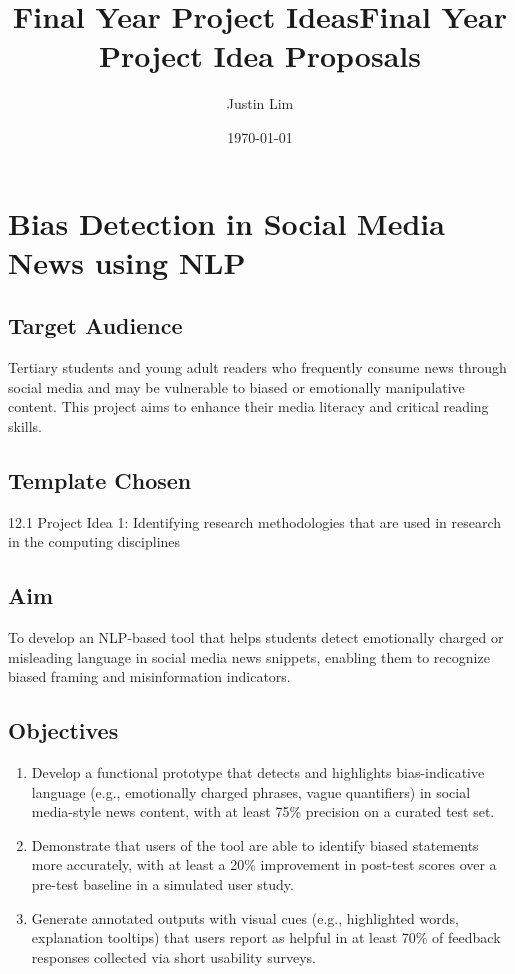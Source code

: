 \documentclass[12pt]{article}
\title{Final Year Project Ideas}
\title{Final Year Project Idea Proposals}
\author{Justin Lim}
\date{\today}
\begin{document}
\maketitle
\tableofcontents
\newpage

\section{Bias Detection in Social Media News using NLP}

\subsection*{Target Audience}
Tertiary students and young adult readers who frequently consume news through social media and may be vulnerable to biased or emotionally manipulative content. This project aims to enhance their media literacy and critical reading skills.

\subsection*{Template Chosen}
12.1 Project Idea 1: Identifying research methodologies that are used
in research in the computing disciplines

\subsection*{Aim}
To develop an NLP-based tool that helps students detect emotionally charged or misleading language in social media news snippets, enabling them to recognize biased framing and misinformation indicators.

\subsection*{Objectives}
\begin{enumerate}[label=\arabic*.]
    \item Develop a functional prototype that detects and highlights bias-indicative language (e.g., emotionally charged phrases, vague quantifiers) in social media-style news content, with at least 75\% precision on a curated test set.
    \item Demonstrate that users of the tool are able to identify biased statements more accurately, with at least a 20\% improvement in post-test scores over a pre-test baseline in a simulated user study.
    \item Generate annotated outputs with visual cues (e.g., highlighted words, explanation tooltips) that users report as helpful in at least 70\% of feedback responses collected via short usability surveys.
\end{enumerate}
\end{document}
